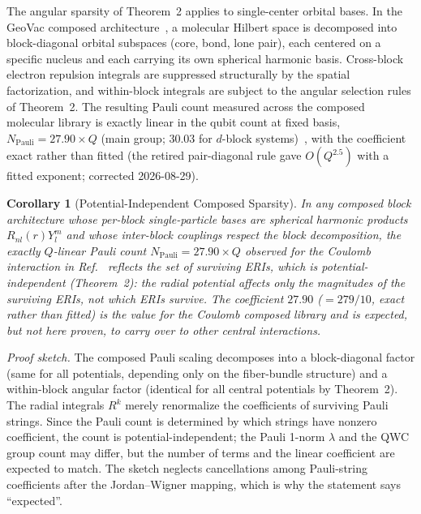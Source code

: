 \documentclass[twocolumn,pra,amsmath,amssymb,superscriptaddress]{revtex4-2}
\begin{document}
The angular sparsity of Theorem~2 applies to single-center orbital
bases.  In the GeoVac composed architecture~\cite{GeoVac_Paper14,
GeoVac_Paper17}, a molecular Hilbert space is decomposed into
block-diagonal orbital subspaces (core, bond, lone pair), each
centered on a specific nucleus and each carrying its own spherical
harmonic basis.  Cross-block electron repulsion integrals are
suppressed structurally by the spatial factorization, and
within-block integrals are subject to the angular selection rules
of Theorem~2.  The resulting Pauli count measured across the
composed molecular library is exactly linear in the qubit count at
fixed basis, $N_{\mathrm{Pauli}} = 27.90 \times Q$ (main group;
$30.03$ for $d$-block systems)~\cite{GeoVac_Paper14}, with the
coefficient exact rather than fitted (the retired pair-diagonal
rule gave $O(Q^{2.5})$ with a fitted exponent; corrected 2026-08-29).

\medskip
\noindent\textbf{Corollary 1} (Potential-Independent
Composed Sparsity). \textit{In any composed block architecture
whose per-block single-particle bases are spherical harmonic
products $R_{nl}(r) Y_l^m$ and whose inter-block couplings respect
the block decomposition, the exactly $Q$-linear Pauli count
$N_{\mathrm{Pauli}} = 27.90 \times Q$ observed for
the Coulomb interaction in
Ref.~\cite{GeoVac_Paper14} reflects the set of surviving ERIs, which
is potential-independent (Theorem~2): the radial potential affects
only the magnitudes of the surviving ERIs, not which ERIs survive.
The coefficient $27.90$ ($= 279/10$, exact rather than fitted) is
the value for the Coulomb composed library and is expected, but not
here proven, to carry over to other central interactions.}

\textit{Proof sketch.}  The composed Pauli scaling decomposes into a
block-diagonal factor (same for all potentials, depending only on
the fiber-bundle structure) and a within-block angular factor
(identical for all central potentials by Theorem~2).  The radial
integrals $R^k$ merely renormalize the coefficients of surviving
Pauli strings.  Since the Pauli count is determined by which strings
have nonzero coefficient, the count is potential-independent; the
Pauli 1-norm $\lambda$ and the QWC group count may differ, but the
number of terms and the linear coefficient are expected to match.  The
sketch neglects cancellations among Pauli-string coefficients after the
Jordan--Wigner mapping, which is why the statement says ``expected''.
\end{document}
